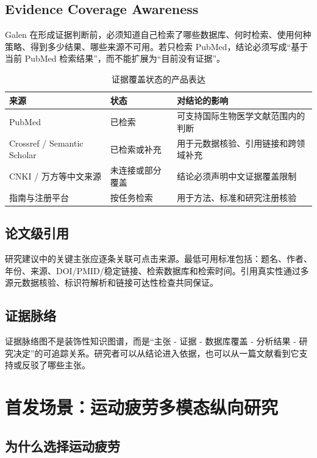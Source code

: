 \documentclass[11pt,a4paper,UTF8]{ctexart}
\begin{document}
\subsection{Evidence Coverage Awareness}

Galen 在形成证据判断前，必须知道自己检索了哪些数据库、何时检索、使用何种策略、得到多少结果、哪些来源不可用。若只检索 PubMed，结论必须写成“基于当前 PubMed 检索结果”，而不能扩展为“目前没有证据”。

\begin{table}[htbp]
\centering
\caption{证据覆盖状态的产品表达}
\begin{tabularx}{\textwidth}{@{}L{3.2cm}L{3.0cm}Y@{}}
\toprule
来源 & 状态 & 对结论的影响 \\
\midrule
PubMed & 已检索 & 可支持国际生物医学文献范围内的判断 \\
Crossref / Semantic Scholar & 已检索或补充 & 用于元数据核验、引用链接和跨领域补充 \\
CNKI / 万方等中文来源 & 未连接或部分覆盖 & 结论必须声明中文证据覆盖限制 \\
指南与注册平台 & 按任务检索 & 用于方法、标准和研究注册核验 \\
\bottomrule
\end{tabularx}
\end{table}

\subsection{论文级引用}

研究建议中的关键主张应逐条关联可点击来源。最低可用标准包括：题名、作者、年份、来源、DOI/PMID/稳定链接、检索数据库和检索时间。引用真实性通过多源元数据核验、标识符解析和链接可达性检查共同保证。

\subsection{证据脉络}

证据脉络图不是装饰性知识图谱，而是“主张 - 证据 - 数据库覆盖 - 分析结果 - 研究决定”的可追踪关系。研究者可以从结论进入依据，也可以从一篇文献看到它支持或反驳了哪些主张。

\section{首发场景：运动疲劳多模态纵向研究}

\subsection{为什么选择运动疲劳}
\end{document}
